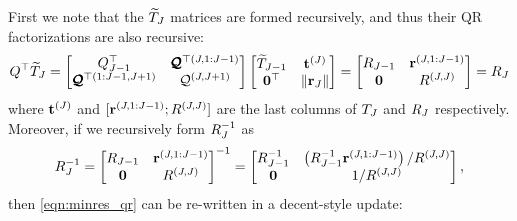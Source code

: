 First we note that the $\widetilde {T}_J$ matrices are formed recursively, and thus their QR factorizations are also recursive:
%
\[
  Q^\top \widetilde {T}_J = \begin{bmatrix}
    Q_{J-1}^\top & \pmb{\mathcal{Q}}^{\top(J,1:J-1)} \\
    \pmb{\mathcal{Q}}^{\top{(1:J-1,J+1)}} & \mathcal{Q}^{(J,J+1)}
  \end{bmatrix} \begin{bmatrix}
    \widetilde {T}_{J-1} & \mathbf{t}^{(J)} \\ \mathbf{0}^\top & \Vert \mathbf{r}_J \Vert
  \end{bmatrix}
  = \begin{bmatrix}
    R_{J-1} & {\mathbf{r}^{(J,1:J-1)}} \\
    \mathbf{0} & R^{(J,J)}
  \end{bmatrix} = R_J
\]
%
where $\mathbf{t}^{(J)}$ and $[\mathbf{r}^{(J,1:J-1)}; R^{(J,J)}]$ are the last columns of $T_J$ and $R_J$ respectively.
Moreover, if we recursively form $R_J^{-1}$ as
%
\[
  R_J^{-1} = \begin{bmatrix}
    R_{J-1} & {\mathbf{r}^{(J,1:J-1)}} \\
    \mathbf{0} & R^{(J,J)}
  \end{bmatrix}^{-1}
  = \begin{bmatrix}
    R_{J-1}^{-1} & \left( R_{J-1}^{-1} {\mathbf{r}^{(J,1:J-1)}} \right) / R^{(J,J)} \\
    \mathbf{0} & 1 / R^{(J,J)}
  \end{bmatrix},
\]
%
then \cref{eqn:minres_qr} can be re-written in a decent-style update:
%
